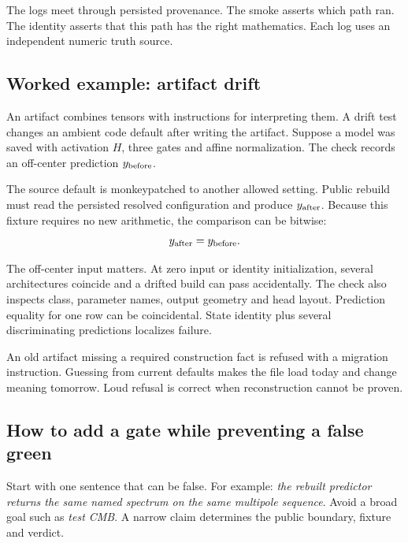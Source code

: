 \documentclass[10pt,aps,prd,twocolumn,nofootinbib]{revtex4-2}
\begin{document}
The logs meet through persisted provenance.  The smoke asserts which path
ran.  The identity asserts that this path has the right mathematics.  Each log
uses an independent numeric truth source.

\subsection{Worked example: artifact drift}

An artifact combines tensors with instructions for interpreting them.  A
drift test changes an ambient code default after writing the artifact.
Suppose a model was saved with activation \(H\), three gates and affine
normalization.  The check records an off-center prediction
\(y_{\rm before}\).

The source default is monkeypatched to another allowed setting.  Public
rebuild must read the persisted resolved configuration and produce
\(y_{\rm after}\).  Because this fixture requires no new arithmetic, the
comparison can be bitwise:
\begin{equation*}
  y_{\rm after}=y_{\rm before}.
\end{equation*}

The off-center input matters.  At zero input or identity initialization,
several architectures coincide and a drifted build can pass accidentally.
The check also inspects class, parameter names, output geometry and head
layout.  Prediction equality for one row can be coincidental.  State identity
plus several discriminating predictions localizes failure.

An old artifact missing a required construction fact is refused with a
migration instruction.  Guessing from current defaults makes the file load
today and change meaning tomorrow.  Loud refusal is correct when
reconstruction cannot be proven.

\subsection{How to add a gate while preventing a false green}

Start with one sentence that can be false.  For example:
\emph{the rebuilt predictor returns the same named spectrum on the same
multipole sequence}.  Avoid a broad goal such as \emph{test CMB}.  A narrow
claim determines the public boundary, fixture and verdict.
\end{document}
